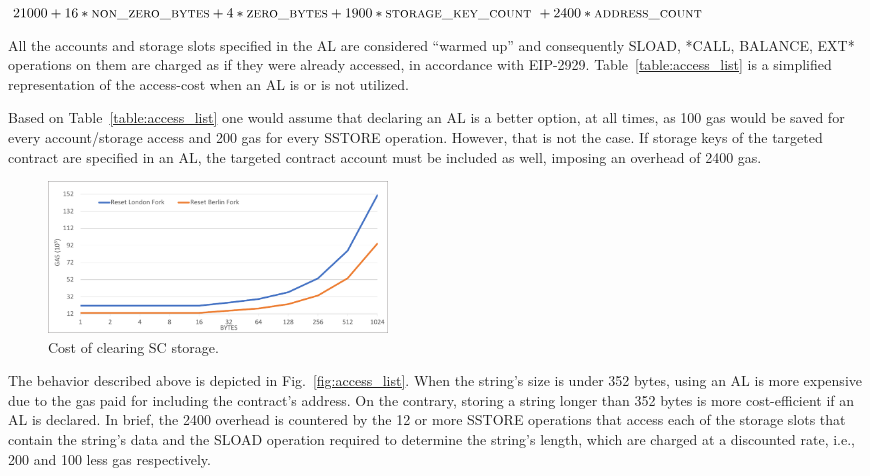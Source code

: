 \begin{flushleft}
\centering
$ 21000 + 16 * \textsc{non\_zero\_bytes} + 4 * \textsc{zero\_bytes} + 1900 * \textsc{storage\_key\_count } + 2400 * \textsc{address\_count}$
\end{flushleft}



\vspace{0.2cm}

All the accounts and storage slots specified in the AL are considered “warmed up” and consequently SLOAD, *CALL, BALANCE, EXT* operations on them are charged as if they were already accessed, in accordance with EIP-2929. Table~\ref{table:access_list} is a simplified representation of the access-cost when an AL is or is not utilized.

Based on Table~\ref{table:access_list} one would assume that declaring an AL is a better option, at all times, as 100 gas would be saved for every account/storage access and 200 gas for every SSTORE operation. However, that is not the case. If storage keys of the targeted contract are specified in an AL, the targeted contract account must be included as well, imposing an overhead of 2400 gas. 

\begin{figure}[htbp]
\centerline{\includegraphics[width=9cm]{figs/reset.pdf}}
\caption{Cost of clearing SC storage.}
\label{fig:reset}
\end{figure}

The behavior described above is depicted in Fig.~\ref{fig:access_list}. When the string’s size is under 352 bytes, using an AL is more expensive due to the gas paid for including the contract’s address. On the contrary, storing a string longer than 352 bytes is more cost-efficient if an AL is declared. In brief, the 2400 overhead is countered by the 12 or more SSTORE operations that access each of the storage slots that contain the string's data and the SLOAD operation required to determine the string's length, which are charged at a discounted rate, i.e., 200 and 100 less gas respectively.

